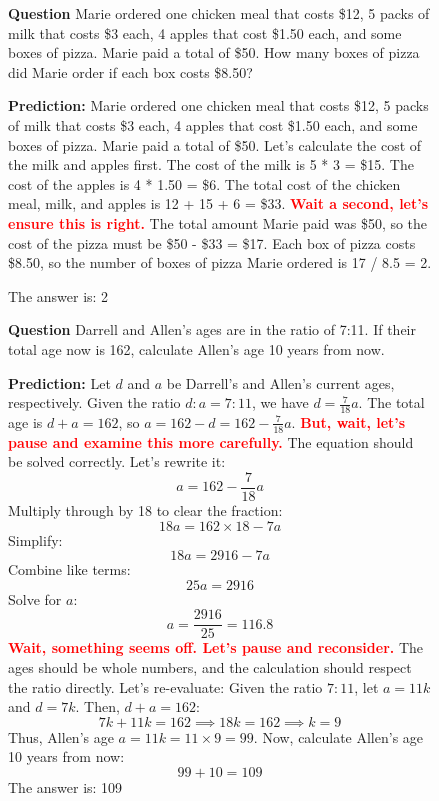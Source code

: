 \begin{figure}
    \begin{tcolorbox}[boxrule=0.5mm, left=1mm, right=1mm, top=1mm, bottom=1mm,title=\textbf{Example 3}]
        \textbf{Question}
        Marie ordered one chicken meal that costs \$12, 5 packs of milk that costs \$3 each, 4 apples that cost \$1.50 each, and some boxes of pizza. Marie paid a total of \$50. How many boxes of pizza did Marie order if each box costs \$8.50?

        \textbf{Prediction:} 
        Marie ordered one chicken meal that costs \$12, 5 packs of milk that costs \$3 each, 4 apples that cost \$1.50 each, and some boxes of pizza. Marie paid a total of \$50. Let's calculate the cost of the milk and apples first. The cost of the milk is 5 * 3 = \$15. The cost of the apples is 4 * 1.50 = \$6. The total cost of the chicken meal, milk, and apples is 12 + 15 + 6 = \$33. \textcolor{red}{\textbf{Wait a second, let's ensure this is right.}} The total amount Marie paid was \$50, so the cost of the pizza must be \$50 - \$33 = \$17. Each box of pizza costs \$8.50, so the number of boxes of pizza Marie ordered is 17 / 8.5 = 2. 
        
        The answer is: 2

    \end{tcolorbox}

    \begin{tcolorbox}[boxrule=0.5mm, left=1mm, right=1mm, top=1mm, bottom=1mm,title=\textbf{Example 4}]
        \textbf{Question}
        Darrell and Allen's ages are in the ratio of 7:11. If their total age now is 162, calculate Allen's age 10 years from now.

        \textbf{Prediction:} 
        Let $d$ and $a$ be Darrell's and Allen's current ages, respectively. Given the ratio $d: a = 7:11$, we have $d = \frac{7}{18}a$. The total age is $d + a = 162$, so $a = 162 - d = 162 - \frac{7}{18}a$. 
        \textcolor{red}{\textbf{But, wait, let's pause and examine this more carefully.}} The equation should be solved correctly. Let's rewrite it:
        \[
            a = 162 - \frac{7}{18}a
        \]
        Multiply through by 18 to clear the fraction:
        \[
            18a = 162 \times 18 - 7a
        \]
        Simplify:
        \[
            18a = 2916 - 7a
        \]
        Combine like terms:
        \[
            25a = 2916
        \]
        Solve for $a$:
        \[
            a = \frac{2916}{25} = 116.8
        \]
        \textcolor{red}{\textbf{Wait, something seems off. Let's pause and reconsider.}} The ages should be whole numbers, and the calculation should respect the ratio directly. Let's re-evaluate:
        Given the ratio $7:11$, let $a = 11k$ and $d = 7k$. Then, $d + a = 162$:
        \[
            7k + 11k = 162 \implies 18k = 162 \implies k = 9
        \]
        Thus, Allen's age $a = 11k = 11 \times 9 = 99$.
        Now, calculate Allen's age 10 years from now:
        \[
            99 + 10 = \boxed{109}
        \]
        The answer is: 109




\end{tcolorbox}
\end{figure}
